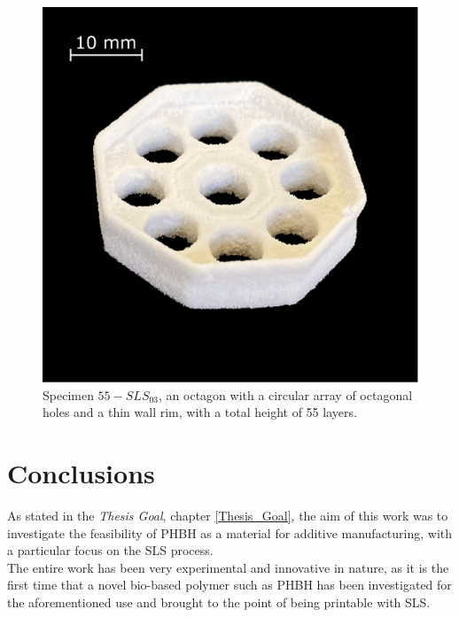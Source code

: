 \documentclass{article}
\begin{document}
        \begin{figure}[ht]
            \centering
            \includegraphics[width=\textwidth]{Pictures/Printed_parts/Fixed/octagon_holes.eps}
            \caption{Specimen $55-SLS_{03}$, an octagon with a circular array of octagonal holes and a thin wall rim, with a total height of 55 layers.}
            \label{fig:printed_specimens_octagonholes}
        \end{figure}
        

        \clearpage

    
    \section{Conclusions\label{conclusions}}

    As stated in the \textit{Thesis Goal}, chapter \ref{Thesis_Goal}, the aim of this work was to investigate the feasibility of PHBH as a 
    material for additive manufacturing, with a particular focus on the SLS process. \\ 

    The entire work has been very experimental and innovative in nature, as it is the first time that a novel bio-based polymer such as PHBH has been investigated 
    for the aforementioned use and brought to the point of being printable with SLS. \\
    
\end{document}
